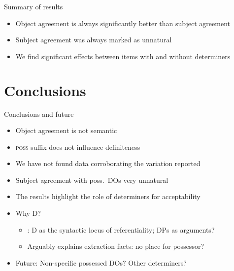 \documentclass[12pt]{beamer}
\begin{document}
\begin{frame}{Summary of results}

    \begin{itemize}

        \item Object agreement is always significantly better than subject
            agreement

        \item Subject agreement was always marked as unnatural

        \item We find significant effects between items with and without
            determiners

    \end{itemize}

\end{frame}


\section{Conclusions}

\begin{frame}{Conclusions and future}

    \begin{itemize}

        \item Object agreement is not semantic

        \item \textsc{poss} suffix does not influence definiteness

        \item We have not found data corroborating the variation reported

        \item Subject agreement with poss.\ DOs very unnatural

        \item The results highlight \alert{the role of determiners for acceptability}

        \item Why D\@?

        \begin{itemize}

            \item \textcite{Longobardi2008,Bernstein2008}: D as the syntactic
                locus of referentiality; DPs as arguments?

            \item Arguably explains extraction facts: no place for possessor?

        \end{itemize}

        \item Future: Non-specific possessed DOs? Other determiners?

    \end{itemize}

\end{frame}
\end{document}
